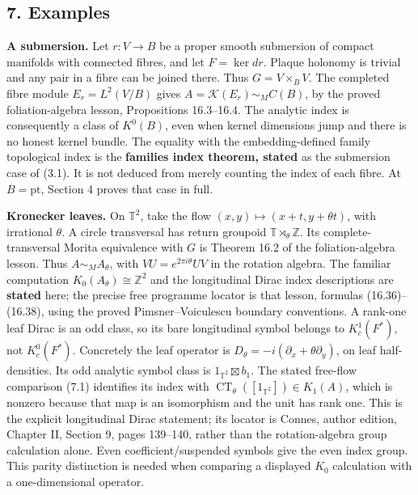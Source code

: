 \documentclass[
  11pt,
]{article}
\begin{document}
\subsection{7. Examples}\label{examples}

\textbf{A submersion.} Let \(r:V\to B\) be a proper smooth submersion of
compact manifolds with connected fibres, and let \(F=\ker dr\). Plaque
holonomy is trivial and any pair in a fibre can be joined there. Thus
\(G=V\times_BV\). The completed fibre module \(E_r=L^2(V/B)\) gives
\(A=\mathcal K(E_r)\sim_M C(B)\), by the proved foliation-algebra
lesson, Propositions 16.3--16.4. The analytic index is consequently a
class of \(K^0(B)\), even when kernel dimensions jump and there is no
honest kernel bundle. The equality with the embedding-defined family
topological index is the \textbf{families index theorem, stated} as the
submersion case of (3.1). It is not deduced from merely counting the
index of each fibre. At \(B=\mathrm{pt}\), Section 4 proves that case in
full.

\textbf{Kronecker leaves.} On \(\mathbb T^2\), take the flow
\((x,y)\mapsto(x+t,y+\theta t)\), with irrational \(\theta\). A circle
transversal has return groupoid \(\mathbb T\rtimes_\theta\mathbb Z\).
Its complete-transversal Morita equivalence with \(G\) is Theorem 16.2
of the foliation-algebra lesson. Thus \(A\sim_M A_\theta\), with
\(VU=e^{2\pi i\theta}UV\) in the rotation algebra. The familiar
computation \(K_0(A_\theta)\cong\mathbb Z^2\) and the longitudinal Dirac
index descriptions are \textbf{stated} here; the precise free programme
locator is that lesson, formulas (16.36)--(16.38), using the proved
Pimsner--Voiculescu boundary conventions. A rank-one leaf Dirac is an
odd class, so its bare longitudinal symbol belongs to \(K_c^1(F^*)\),
not \(K_c^0(F^*)\). Concretely the leaf operator is
\(D_\theta=-i(\partial_x+\theta\partial_y)\), on leaf half-densities.
Its odd analytic symbol class is \(1_{\mathbb T^2}\boxtimes b_1\). The
stated free-flow comparison (7.1) identifies its index with
\(\operatorname{CT}_\theta([1_{\mathbb T^2}])\in K_1(A)\), which is
nonzero because that map is an isomorphism and the unit has rank one.
This is the explicit longitudinal Dirac statement; its locator is
Connes, author edition, Chapter II, Section 9, pages 139--140, rather
than the rotation-algebra group calculation alone. Even
coefficient/suspended symbols give the even index group. This parity
distinction is needed when comparing a displayed \(K_0\) calculation
with a one-dimensional operator.
\end{document}
